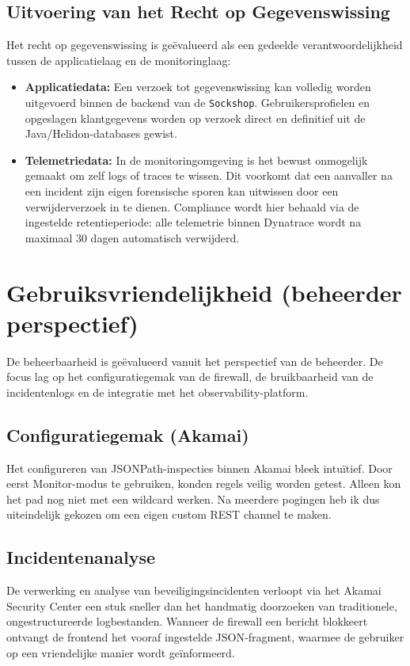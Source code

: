 \subsection{Uitvoering van het Recht op Gegevenswissing}
Het recht op gegevenswissing is geëvalueerd als een gedeelde verantwoordelijkheid tussen de applicatielaag en de monitoringlaag:
\begin{itemize}
    \item \textbf{Applicatiedata:} Een verzoek tot gegevenswissing kan volledig worden uitgevoerd binnen de backend van de \texttt{Sockshop}. Gebruikersprofielen en opgeslagen klantgegevens worden op verzoek direct en definitief uit de Java/Helidon-databases gewist.
    \item \textbf{Telemetriedata:} In de monitoringomgeving is het bewust onmogelijk gemaakt om zelf logs of traces te wissen. Dit voorkomt dat een aanvaller na een incident zijn eigen forensische sporen kan uitwissen door een verwijderverzoek in te dienen. Compliance wordt hier behaald via de ingestelde retentieperiode: alle telemetrie binnen Dynatrace wordt na maximaal 30 dagen automatisch verwijderd.
\end{itemize}

\section{Gebruiksvriendelijkheid (beheerder perspectief)}

De beheerbaarheid is geëvalueerd vanuit het perspectief van de beheerder. De focus lag op het configuratiegemak van de firewall, de bruikbaarheid van de incidentenlogs en de integratie met het observability-platform.

\subsection{Configuratiegemak (Akamai)}

Het configureren van JSONPath-inspecties binnen Akamai bleek intuïtief. Door eerst Monitor-modus te gebruiken, konden regels veilig worden getest. Alleen kon het pad nog niet met een wildcard werken. Na meerdere pogingen heb ik dus uiteindelijk gekozen om een eigen custom REST channel te maken.

\subsection{Incidentenanalyse}
De verwerking en analyse van beveiligingsincidenten verloopt via het Akamai Security Center een stuk sneller dan het handmatig doorzoeken van traditionele, ongestructureerde logbestanden. Wanneer de firewall een bericht blokkeert ontvangt de frontend het vooraf ingestelde JSON-fragment, waarmee de gebruiker op een vriendelijke manier wordt geïnformeerd.\\

